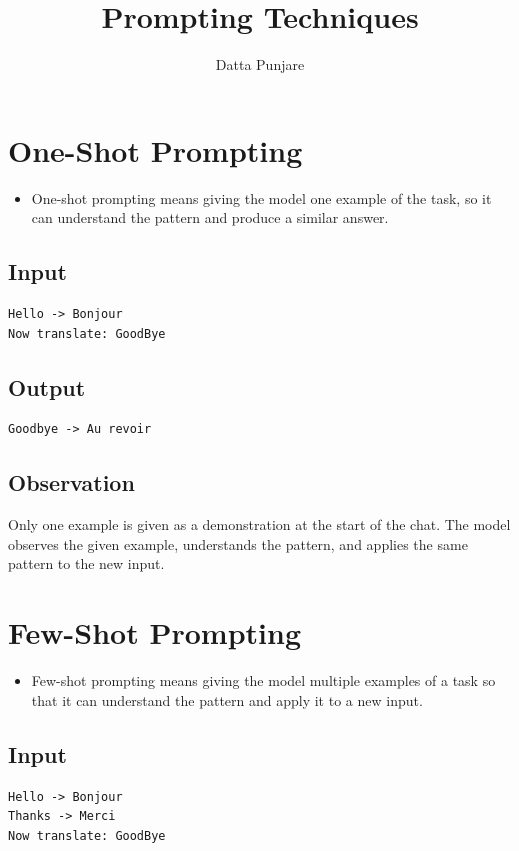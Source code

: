 \documentclass[12pt]{article}
\title{Prompting Techniques}
\author{Datta Punjare}
\date{}
\begin{document}
\maketitle

\section{One-Shot Prompting}

\begin{itemize}
    \item One-shot prompting means giving the model one example of the task, so it can understand the pattern and produce a similar answer.
\end{itemize}

\subsection*{Input}
\begin{verbatim}
Hello -> Bonjour
Now translate: GoodBye
\end{verbatim}

\subsection*{Output}
\begin{verbatim}
Goodbye -> Au revoir
\end{verbatim}

\subsection*{Observation}
Only one example is given as a demonstration at the start of the chat. The model observes the given example, understands the pattern, and applies the same pattern to the new input.


\section{Few-Shot Prompting}

\begin{itemize}
    \item Few-shot prompting means giving the model multiple examples of a task so that it can understand the pattern and apply it to a new input.
\end{itemize}

\subsection*{Input}
\begin{verbatim}
Hello -> Bonjour
Thanks -> Merci
Now translate: GoodBye
\end{verbatim}
\end{document}
